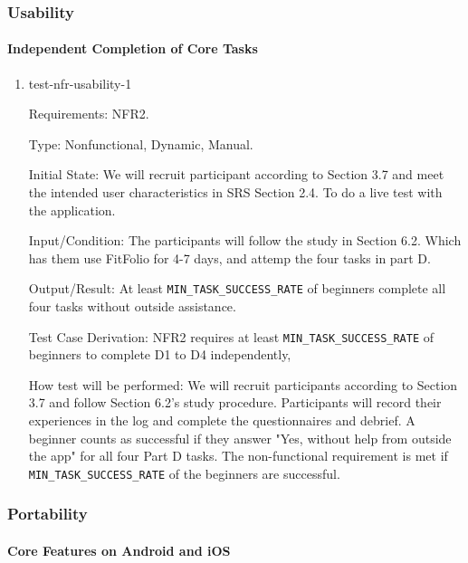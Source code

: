 \documentclass[12pt, titlepage]{article}
\begin{document}
\subsubsection{Usability}

\paragraph{Independent Completion of Core Tasks}

\begin{enumerate}

\item{test-nfr-usability-1\\}

Requirements: NFR2.

Type: Nonfunctional, Dynamic, Manual.

Initial State: We will recruit participant according to Section 3.7
and meet the intended user characteristics in SRS Section 2.4.
To do a live test with the application.

Input/Condition: The participants will follow the study in Section 6.2.
Which has them use FitFolio for 4-7 days, and attemp the four tasks
in part D.

Output/Result: At least \texttt{MIN\_TASK\_SUCCESS\_RATE} 
of beginners complete all four tasks without outside assistance.

Test Case Derivation: NFR2 requires at least
\texttt{MIN\_TASK\_SUCCESS\_RATE} of beginners to complete
D1 to D4 independently,

How test will be performed: We will recruit participants according
to Section 3.7 and follow Section 6.2's study procedure. Participants
will record their experiences in the log and complete the questionnaires
and debrief. A beginner counts as successful if they answer
"Yes, without help from outside the app" for all four Part D tasks.
The non-functional requirement is met if \texttt{MIN\_TASK\_SUCCESS\_RATE} of the beginners
are successful.

\end{enumerate}

\subsubsection{Portability}

\paragraph{Core Features on Android and iOS}
\end{document}
